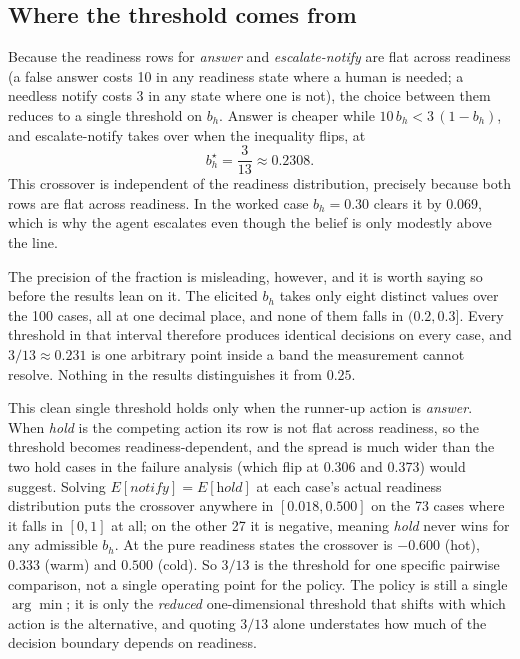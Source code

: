 \documentclass{article}
\begin{document}
\subsection{Where the threshold comes from}
Because the readiness rows for \emph{answer} and \emph{escalate-notify} are flat
across readiness (a false answer costs 10 in any readiness state where a human
is needed; a needless notify costs 3 in any state where one is not), the choice
between them reduces to a single threshold on $b_h$. Answer is cheaper while
$10\,b_h < 3\,(1 - b_h)$, and escalate-notify takes over when the inequality
flips, at
\begin{equation}
b_h^{\star} = \frac{3}{13} \approx 0.2308 .
\end{equation}
This crossover is independent of the readiness distribution, precisely because
both rows are flat across readiness. In the worked case $b_h = 0.30$ clears it
by 0.069, which is why the agent escalates even though the belief is only
modestly above the line.

The precision of the fraction is misleading, however, and it is worth saying so
before the results lean on it. The elicited $b_h$ takes only eight distinct values
over the 100 cases, all at one decimal place, and none of them falls in
$(0.2, 0.3]$. Every threshold in that interval therefore produces identical
decisions on every case, and $3/13 \approx 0.231$ is one arbitrary point inside a
band the measurement cannot resolve. Nothing in the results distinguishes it from
$0.25$.

This clean single threshold holds only when the runner-up action is
\emph{answer}. When \emph{hold} is the competing action its row is not flat
across readiness, so the threshold becomes readiness-dependent, and the spread is
much wider than the two hold cases in the failure analysis (which flip at 0.306
and 0.373) would suggest. Solving $E[\textit{notify}] = E[\textit{hold}]$ at each
case's actual readiness distribution puts the crossover anywhere in
$[0.018, 0.500]$ on the 73 cases where it falls in $[0, 1]$ at all; on the other
27 it is negative, meaning \emph{hold} never wins for any admissible $b_h$. At the
pure readiness states the crossover is $-0.600$ (hot), $0.333$ (warm) and $0.500$
(cold). So $3/13$ is the threshold for one specific pairwise comparison, not a
single operating point for the policy. The policy is still a single $\arg\min$; it
is only the \emph{reduced} one-dimensional threshold that shifts with which action
is the alternative, and quoting $3/13$ alone understates how much of the decision
boundary depends on readiness.
\end{document}
